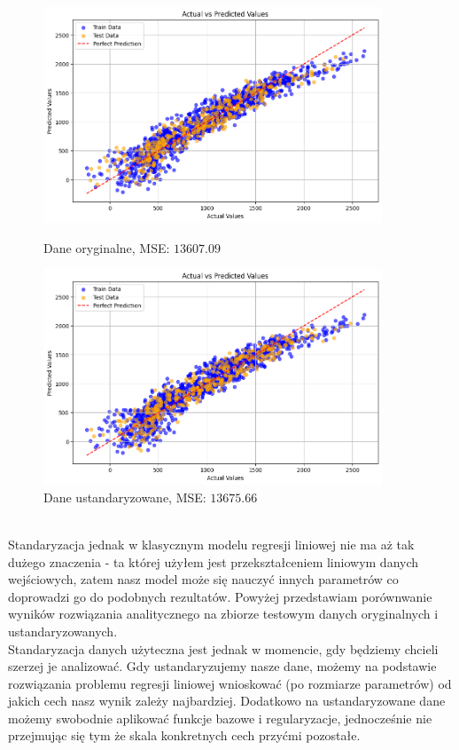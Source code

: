 \documentclass[polish,12pt,a4paper]{extarticle}
\begin{document}
\begin{figure}[h!]
    \centering
    \begin{minipage}[b]{0.48\textwidth}
        \centering
    \includegraphics[width=0.9\textwidth]{regular.png} %
    \caption{Dane oryginalne, MSE: $13607.09$}
    \end{minipage}
    \hspace{0.02\textwidth}
    \begin{minipage}[b]{0.48\textwidth}
        \centering
    \includegraphics[width=0.9\textwidth]{standard.png} %
    \caption{Dane ustandaryzowane, MSE: $13675.66$}
    \end{minipage}
\end{figure} \\
Standaryzacja jednak w klasycznym modelu regresji liniowej nie ma aż tak dużego znaczenia - ta której użyłem jest przekształceniem liniowym danych wejściowych, zatem nasz model może się nauczyć innych parametrów co doprowadzi go do podobnych rezultatów. Powyżej przedstawiam porównwanie wyników rozwiązania analitycznego na zbiorze testowym danych oryginalnych i ustandaryzowanych. \bigskip \\
Standaryzacja danych użyteczna jest jednak w momencie, gdy będziemy chcieli szerzej je analizować. Gdy ustandaryzujemy nasze dane, możemy na podstawie rozwiązania problemu regresji liniowej wnioskować (po rozmiarze parametrów) od jakich cech nasz wynik zależy najbardziej. Dodatkowo na ustandaryzowane dane możemy swobodnie aplikować funkcje bazowe i regularyzacje, jednocześnie nie przejmując się tym że skala konkretnych cech przyćmi pozostałe.
\end{document}
